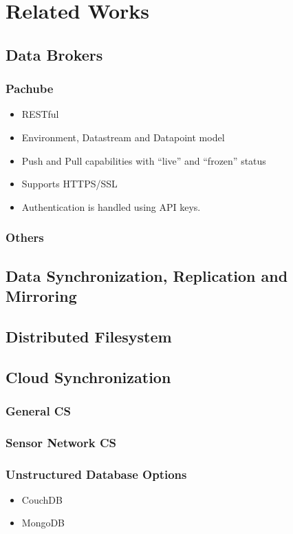 \section{Related Works}
	\subsection{Data Brokers}
		\subsubsection{Pachube}
			\begin{itemize}
				\item RESTful
				\item Environment, Datastream and Datapoint model
				\item Push and Pull capabilities with ``live'' and ``frozen'' status
				\item Supports HTTPS/SSL
				\item Authentication is handled using API keys.
			\end{itemize}		
			\cite{Pachube2011}
		\subsubsection{Others}	
			\cite{briefingscan}	
	\subsection{Data Synchronization, Replication and Mirroring}
		\cite{agarwal2002scalability}
	\subsection{Distributed Filesystem}		
		\cite{dong2011rfs}
	\subsection{Cloud Synchronization}
		\subsubsection{General CS}
			\cite{uppoor2010cloud}
			\cite{armbrust2009above}
		\subsubsection{Sensor Network CS}		
			\cite{hassan2009framework}
			\cite{lee2010system}
			\cite{melchor2011design}
			\cite{patil2011usable}
			\cite{stuedi2010wherestore}
	\subsubsection{Unstructured Database Options}
		\begin{itemize}
		\item CouchDB
		\item MongoDB
		\end{itemize}
